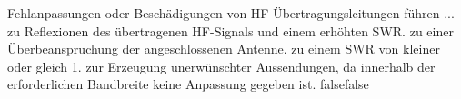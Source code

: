     {Fehlanpassungen oder Beschädigungen von HF-Übertragungsleitungen führen ...}
    {zu Reflexionen des übertragenen HF-Signals und einem erhöhten SWR.}
    {zu einer Überbeanspruchung der angeschlossenen Antenne.}
    {zu einem SWR von kleiner oder gleich 1.}
    {zur Erzeugung unerwünschter Aussendungen, da innerhalb der erforderlichen Bandbreite keine Anpassung gegeben ist.}
    {false}{false}